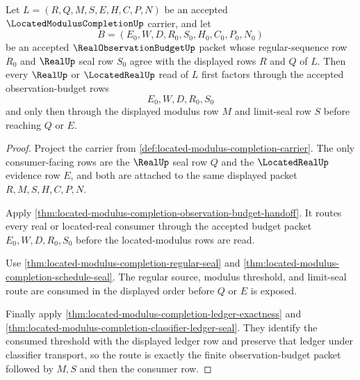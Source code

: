 \begin{theorem}
\label{thm:located-modulus-completion-real-observation-budget-route}
Let $L=(R,Q,M,S,E,H,C,P,N)$ be an accepted $\LocatedModulusCompletionUp$ carrier, and let
$$
B=(E_0,W,D,R_0,S_0,H_0,C_0,P_0,N_0)
$$
be an accepted $\RealObservationBudgetUp$ packet whose regular-sequence row $R_0$ and $\RealUp$ seal row $S_0$ agree with the displayed rows $R$ and $Q$ of $L$. Then every $\RealUp$ or $\LocatedRealUp$ read of $L$ first factors through the accepted observation-budget rows
$$
E_0,W,D,R_0,S_0
$$
and only then through the displayed modulus row $M$ and limit-seal row $S$ before reaching $Q$ or $E$.
\end{theorem}
\begin{proof}
Project the carrier from \autoref{def:located-modulus-completion-carrier}. The only consumer-facing rows are the $\RealUp$ seal row $Q$ and the $\LocatedRealUp$ evidence row $E$, and both are attached to the same displayed packet $R,M,S,H,C,P,N$.

Apply \autoref{thm:located-modulus-completion-observation-budget-handoff}. It routes every real or located-real consumer through the accepted budget packet $E_0,W,D,R_0,S_0$ before the located-modulus rows are read.

Use \autoref{thm:located-modulus-completion-regular-seal} and \autoref{thm:located-modulus-completion-schedule-seal}. The regular source, modulus threshold, and limit-seal route are consumed in the displayed order before $Q$ or $E$ is exposed.

Finally apply \autoref{thm:located-modulus-completion-ledger-exactness} and \autoref{thm:located-modulus-completion-classifier-ledger-seal}. They identify the consumed threshold with the displayed ledger row and preserve that ledger under classifier transport, so the route is exactly the finite observation-budget packet followed by $M,S$ and then the consumer row.
\end{proof}

